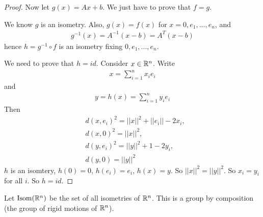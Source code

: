 \documentclass[a4paper]{article}
\begin{document}
\begin{thm}
\begin{proof}
Now let $g(x)=Ax+b$. We just have to prove that $f=g$.

We know $g$ is an isometry. Also, $g(x)=f(x)$ for $x=0,e_1,...,e_n$, and
\begin{equation*}
\begin{aligned}
g^{-1}(x)=A^{-1}(x-b)=A^T(x-b)
\end{aligned}
\end{equation*}
hence $h=g^{-1}\circ f$ is an isometry fixing $0,e_1,...,e_n$.

We need to prove that $h = id$. Consider $x \in \mathbb{R}^n$. Write
\begin{equation*}
\begin{aligned}
x=\sum_{i=1}^n x_i e_i
\end{aligned}
\end{equation*}
and
\begin{equation*}
\begin{aligned}
y=h(x)=\sum_{i=1}^n y_i e_i
\end{aligned}
\end{equation*}
Then
\begin{equation*}
\begin{aligned}
&d(x,e_i)^2 = ||x||^2+||e_i||-2x_i,\\
&d(x,0)^2 = ||x||^2,\\
&d(y,e_i)^2 = ||y||^2+1-2y_i,\\
&d(y,0) = ||y||^2
\end{aligned}
\end{equation*}
$h$ is an isomtery, $h(0)=0$, $h(e_i)=e_i$, $h(x)=y$. So $||x||^2 = ||y||^2$. So $x_i = y_i$ for all $i$. So $h=id$.
\end{proof}
\end{thm}

Let $\operatorname{Isom}(\mathbb{R}^n)$ be the set of all isometries of $\mathbb{R}^n$. This is a group by composition (the group of rigid motions of $\mathbb{R}^n$).
\end{document}
